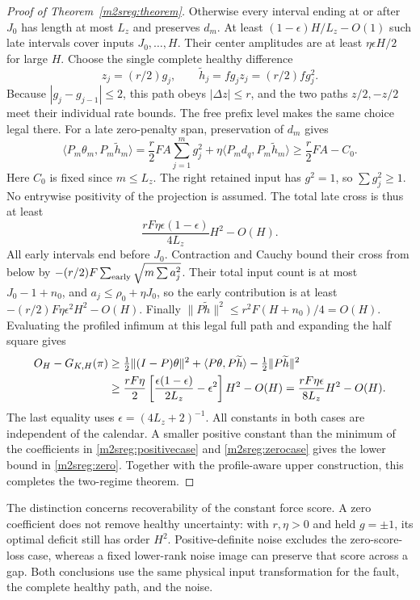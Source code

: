 \documentclass[11pt]{article}
\begin{document}
\begin{proof}[Proof of Theorem~\ref{m2sreg:theorem}]
Otherwise every interval ending at or after $J_0$ has length
at most $L_z$ and preserves $d_m$.
At least $(1-\epsilon)H/L_z-O(1)$ such late intervals cover
inputs $J_0,\ldots,H$. Their center amplitudes are at least
$\eta\epsilon H/2$ for large $H$.
Choose the single complete healthy difference
\[
z_j=(r/2)g_j,\qquad \widetilde h_j=fg_jz_j=(r/2)fg_j^2 .
\]
Because $|g_j-g_{j-1}|\le2$, this path obeys $|\Delta z|\le r$,
and the two paths $z/2,-z/2$ meet their individual rate bounds.
The free prefix level makes the same choice legal there.
For a late zero-penalty span, preservation of $d_m$ gives
\[
\langle P_m\theta_m,P_m\widetilde h_m\rangle
=\frac r2FA\sum_{j=1}^m g_j^2+
 \eta\langle P_md_q,P_m\widetilde h_m\rangle
\ge \frac r2FA-C_0 .
\]
Here $C_0$ is fixed since $m\le L_z$.
The right retained input has $g^2=1$, so $\sum g_j^2\ge1$.
No entrywise positivity of the projection is assumed.
The total late cross is thus at least
\[
\frac{rF\eta\epsilon(1-\epsilon)}{4L_z}H^2-O(H).
\]
All early intervals end before $J_0$.
Contraction and Cauchy bound their cross from below by
$-(r/2)F\sum_{\rm early}\sqrt{m\sum a_j^2}$.
Their total input count is at most $J_0-1+n_0$, and
$a_j\le\rho_0+\eta J_0$, so the early contribution is at least
$-(r/2)F\eta\epsilon^2H^2-O(H)$.
Finally $\|P\widetilde h\|^2\le r^2F(H+n_0)/4=O(H)$.
Evaluating the profiled infimum at this legal full path and expanding
the half square gives
\begin{align}
O_H-G_{K,H}(\pi)
&\ge \tfrac12\|(I-P)\theta\|^2+
 \langle P\theta,P\widetilde h\rangle-
 \tfrac12\|P\widetilde h\|^2 \notag\\
&\ge \frac{rF\eta}{2}
 \left[\frac{\epsilon(1-\epsilon)}{2L_z}-\epsilon^2\right]H^2-O(H)
 =\frac{rF\eta\epsilon}{8L_z}H^2-O(H).
\label{m2sreg:zerocase}
\end{align}
The last equality uses $\epsilon=(4L_z+2)^{-1}$.
All constants in both cases are independent of the calendar.
A smaller positive constant than the minimum of the coefficients
in \eqref{m2sreg:positivecase} and \eqref{m2sreg:zerocase}
gives the lower bound in \eqref{m2sreg:zero}.
Together with the profile-aware upper construction, this completes
the two-regime theorem.
\end{proof}

The distinction concerns recoverability of the constant force score.
A zero coefficient does not remove healthy uncertainty: with
$r,\eta>0$ and held $g=\pm1$, its optimal deficit still has order $H^2$.
Positive-definite noise excludes the zero-score-loss case, whereas
a fixed lower-rank noise image can preserve that score across a gap.
Both conclusions use the same physical input transformation for the
fault, the complete healthy path, and the noise.
\end{document}
